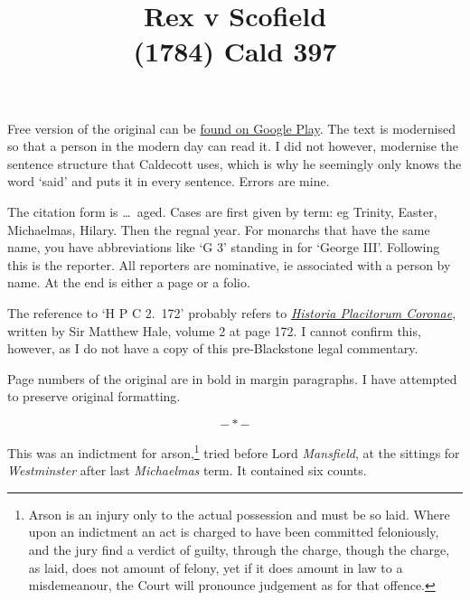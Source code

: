 \documentclass[a4paper]{article}
\title{\vspace{-6ex} Rex v Scofield \\
{\large (1784) Cald 397}}
\author{\vspace{-6ex}}
\date{\vspace{-6ex}}
\begin{document}
\maketitle

Free version of the original can be  \href{https://play.google.com/books/reader?id=ZFcDAAAAQAAJ&hl=en_GB&pg=GBS.PA396}{found on Google Play}. The text is modernised so that a person in the modern day can read it. I did not however, modernise the sentence structure that Caldecott uses, which is why he seemingly only knows the word `said' and puts it in every sentence. Errors are mine.

The citation form is \ldots\ aged. Cases are first given by term: eg Trinity, Easter, Michaelmas, Hilary. Then the regnal year. For monarchs that have the same name, you have abbreviations like `G 3' standing in for `George III'. Following this is the reporter. All reporters are nominative, ie associated with a person by name. At the end is either a page or a folio.

The reference to `H P C 2.~172' probably refers to \href{https://en.wikipedia.org/wiki/Historia_Placitorum_Coron\%C3\%A6}{\emph{Historia Placitorum Coronae}}, written by Sir Matthew Hale, volume 2 at page 172. I cannot confirm this, however, as I do not have a copy of this pre-Blackstone legal commentary.

Page numbers of the original are in bold in margin paragraphs. I have attempted to preserve original formatting.

$$- * -$$

  This was an indictment for arson,\footnote{Arson is an injury only to the actual possession and must be so laid. Where upon an indictment an act is charged to have been committed feloniously, and the jury find a verdict of guilty, through the charge, though the charge, as laid, does not amount of felony, yet if it does amount in law to a misdemeanour, the Court will pronounce judgement as for that offence.} tried before Lord \emph{Mansfield}, at the sittings for \emph{Westminster} after last \emph{Michaelmas} term. It contained six counts.
\end{document}
